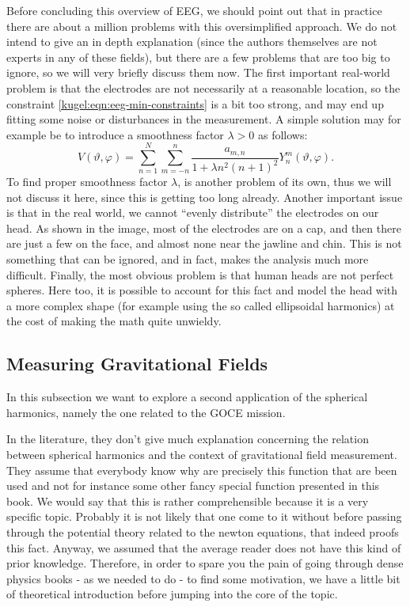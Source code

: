 Before concluding this overview of EEG, we should point out that in practice
there are about a million problems with this oversimplified approach. We do not
intend to give an in depth explanation (since the authors themselves are not
experts in any of these fields), but there are a few problems that are too big
to ignore, so we will very briefly discuss them now. The first important
real-world problem is that the electrodes are not necessarily at a reasonable
location, so the constraint \eqref{kugel:eqn:eeg-min-constraints} is a bit too
strong, and may end up fitting some noise or disturbances in the measurement. A
simple solution may for example be to introduce a smoothness factor $\lambda >
0$ as follows:
\begin{equation}
  V(\vartheta, \varphi) = \sum_{n=1}^N \sum_{m=-n}^n 
    \frac{a_{m,n}}{1 + \lambda n^2(n+1)^2} Y^m_n(\vartheta, \varphi).
\end{equation}
To find proper smoothness factor $\lambda$, is another problem of its own, thus
we will not discuss it here, since this is getting too long already. Another
important issue is that in the real world, we cannot ``evenly distribute'' the
electrodes on our head. As shown in the image, most of the electrodes are on a
cap, and then there are just a few on the face, and almost none near the jawline
and chin. This is not something that can be ignored, and in fact, makes the
analysis much more difficult. Finally, the most obvious problem is that human
heads are not perfect spheres. Here too, it is possible to account for this fact
and model the head with a more complex shape (for example using the so called
ellipsoidal harmonics) at the cost of making the math quite unwieldy.

\subsection{Measuring Gravitational Fields}
In this subsection we want to explore a second application of the spherical harmonics, namely the one related to the GOCE mission. 

In the literature, they don’t give much explanation concerning the relation between spherical harmonics and the context of gravitational 
field measurement. They assume that everybody know why are precisely this function that are been used and not for instance some other 
fancy special function presented in this book. We would say that this is rather comprehensible because it is a very specific topic. 
Probably it is not likely that one come to it without before passing through the potential theory related to the newton equations, 
that indeed proofs this fact. Anyway, we assumed that the average reader does not have this kind of prior knowledge. 
Therefore, in order to spare you the pain of going through dense physics books
\cite{blakely_1995}\cite{hofmann2005physical}\cite{proof-relation-divergence&dirac} 
- as we needed to do - to find some motivation, we have a little bit of theoretical introduction before jumping into the core of the topic. 

